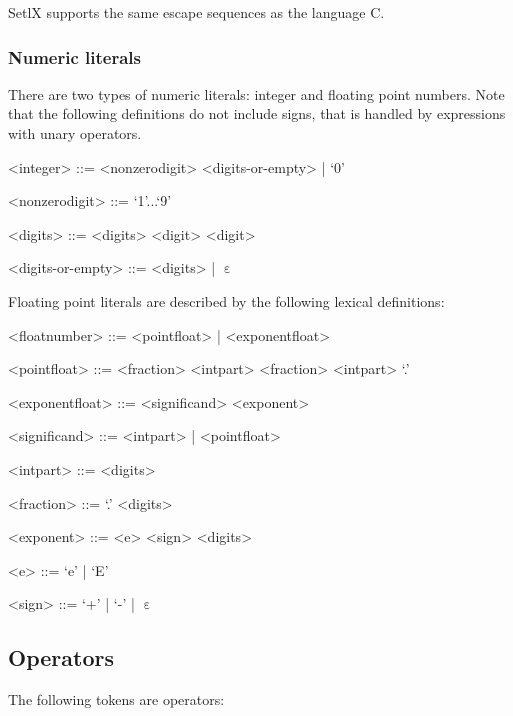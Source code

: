 SetlX supports the same escape sequences as the language C.

%
\subsubsection{Numeric literals}

There are two types of numeric literals: integer and floating point numbers. Note that the following definitions do not include signs, that is handled by expressions with unary operators.


\begin{grammar}
<integer> ::=  <nonzerodigit> <digits-or-empty> | `0'

<nonzerodigit>   ::=  `1'...`9'

<digits> ::= <digits> <digit>
\alt <digit>

<digits-or-empty> ::= <digits> | $\upepsilon$
\end{grammar}


Floating point literals are described by the following lexical definitions:

\begin{grammar}
<floatnumber>   ::=  <pointfloat> | <exponentfloat>

<pointfloat>    ::=  <fraction>
\alt <intpart> <fraction>
\alt <intpart> `.'

<exponentfloat> ::=  <significand> <exponent>

<significand> ::= <intpart> | <pointfloat>

<intpart>       ::=  <digits>

<fraction>      ::=  `.' <digits>

<exponent>      ::= <e> <sign> <digits>

<e> ::= `e' | `E'

<sign> ::= `+' | `-' | $\upepsilon$

\end{grammar}

%
%
\subsection{Operators}

The following tokens are operators:

